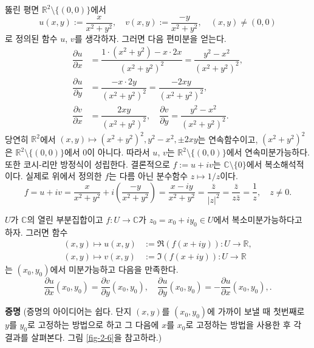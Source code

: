 \begin{saltexample}[label=example-2-6]{}{}
뚫린 평면 $\mathbb R^2 \setminus \{(0,0)\}$에서 
\[
u(x,y) := \dfrac{x}{x^2+y^2}, \quad
v(x,y) := \dfrac{-y}{x^2+y^2}, \quad (x,y)\ne(0,0)
\]
로 정의된 함수 
$u$, $v$를 생각하자.
그러면 다음 편미분을 얻는다.
\begin{align*}
\dfrac{\partial u}{\partial x} &= \dfrac{1\cdot(x^2+y^2)-x\cdot 2x}{(x^2+y^2)^2}
= \dfrac{y^2-x^2}{(x^2+y^2)^2}, \\
\dfrac{\partial u}{\partial y} &= \dfrac{-x\cdot 2y}{(x^2+y^2)^2}
= \dfrac{-2xy}{(x^2+y^2)^2}, \\
\dfrac{\partial v}{\partial x} &= \dfrac{2xy}{(x^2+y^2)^2}, \quad
\dfrac{\partial v}{\partial y} = \dfrac{y^2-x^2}{(x^2+y^2)^2}.
\end{align*}
당연히 $\mathbb R^2$에서 $(x,y) \mapsto (x^2+y^2)^2, y^2-x^2, \pm 2xy$는 
연속함수이고, $(x^2+y^2)^2$은 $\mathbb R^2 \setminus \{(0,0)\}$에서 
$0$이 아니다.
따라서 $u$, $v$는 $\mathbb R^2 \setminus \{(0,0)\}$에서 
연속미분가능하다.
또한 코시-리만 방정식이 성립한다. 
결론적으로 $f:=u+iv$는 $\mathbb C\setminus\{0\}$에서 
복소해석적이다.
실제로 위에서 정의한 $f$는 다름 아닌 분수함수 $z\mapsto 1/z$이다.
\[
f=u+iv= \dfrac x{x^2+y^2}+i\left(\dfrac{-y}{x^2+y^2}\right)
= \dfrac{x-iy}{x^2+y^2} = \dfrac{\bar z}{|z|^2} = \dfrac{\bar z}{z \bar z}
= \dfrac  1z, \quad z\ne 0.
\]
\end{saltexample}


\begin{salttheorem}{}{} \label{thm-2-1}
$U$가 $\mathbb C$의 열린 부분집합이고
$f:U\to \mathbb C$가 $z_0=x_0+iy_0\in U$에서 복소미분가능하다고 하자.
그러면 함수
\begin{align*}
(x,y) \mapsto u(x,y) & := \Re(f(x+iy)): U\to \mathbb R, \\
(x,y) \mapsto v(x,y) & := \Im(f(x+iy)): U\to \mathbb R
\end{align*}
는 $(x_0, y_0)$에서 미분가능하고 다음을 만족한다.
\begin{equation} \label{eq-2-3}
\dfrac{\partial u}{\partial x}(x_0,y_0) = \dfrac{\partial v}{\partial y}(x_0,y_0),
\quad
\dfrac{\partial u}{\partial y}(x_0,y_0) = - \dfrac{\partial u}{\partial x}(x_0,y_0),.
\end{equation}
\end{salttheorem}

{\bf 증명}
(증명의 아이디어는 쉽다. 단지 $(x,y)$를 $(x_0, y_0)$에 가까이 보낼 때
첫번째로 $y$를 $y_0$로 고정하는 방법으로 하고 그 다음에 
$x$를 $x_0$로 고정하는 방법을 사용한 후 각 결과를 살펴본다.
그림 \ref{fig-2-6}을 참고하라.)

